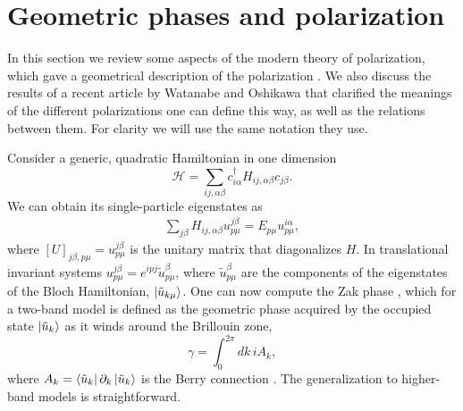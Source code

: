 \documentclass[twocolumn,amsmath,longbibliography,amssymb,superscriptaddress]{revtex4-1}
\begin{document}
\section{Geometric phases and polarization}

In this section we review some aspects of the modern theory of polarization, which gave a geometrical description of the polarization \cite{Resta1992,KingSmith1993,Vanderbilt1993,Resta1997}. 
We also discuss the results of a recent article by Watanabe and Oshikawa \cite{Watanabe2018} that clarified the meanings of the different polarizations one can define this way, as well as the relations between them. 
For clarity we will use the same notation they use. 

Consider a generic, quadratic Hamiltonian in one dimension
\begin{equation}\label{eq:quadr_Ham}
\mathcal{H} = \sum_{ij,\alpha\beta} c_{i\alpha}^\dagger H_{ij,\alpha \beta}c_{j\beta}.
\end{equation}
We can obtain its single-particle eigenstates as
\begin{align}
\sum_{j\beta}H_{ij,\alpha\beta} u_{p\mu}^{j\beta} = E_{p\mu} u^{i\alpha}_{p\mu},
\end{align}
where $[U]_{j\beta,p\mu} = u_{p\mu}^{j\beta}$ is the unitary matrix that diagonalizes $H$. In translational invariant systems $u_{p\mu}^{j\beta} = e^{ipj}\tilde{u}_{p \mu}^{\beta}$, where $\tilde{u}_{p \mu}^{\beta}$ are the components of the eigenstates of the Bloch Hamiltonian, $\ket{\tilde{u}_{k\mu}}$. One can now compute the Zak phase \cite{Zak1989}, which for a two-band  model is defined as the geometric phase acquired by the occupied state $\ket{\tilde{u}_k}$ as it winds around the Brillouin zone,
\begin{equation}
\gamma = \int_{0}^{2\pi} dk\, i A_k, 
\label{eq:zak_phase}
\end{equation}
where $A_k = \bra{\tilde{u}_k}\partial_k \ket{\tilde{u}_k}$ is the Berry connection \cite{Berry1984}. 
The generalization to higher-band models is straightforward. 
\end{document}
